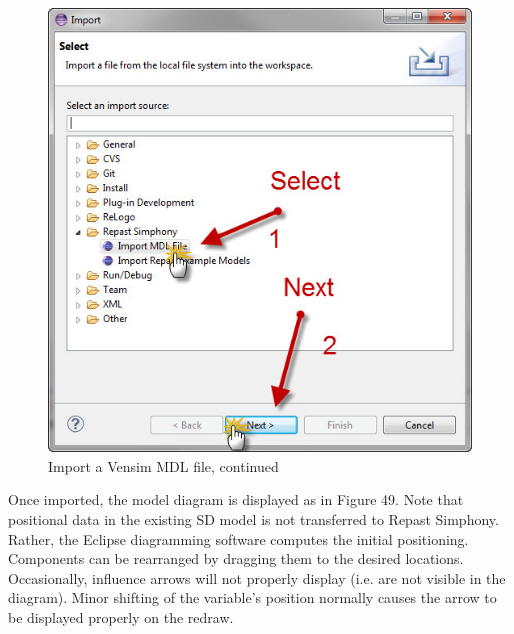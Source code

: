 \documentclass[11pt]{amsart}
\begin{document}
\begin{figure}[ht]
\begin{center}
\vspace{.2in}
\centerline {
\includegraphics[totalheight=0.3\textheight]{images/046.jpg}
}
\caption{Import a Vensim MDL file, continued}
\label{fig:046}
\end{center}
\end{figure}

Once imported, the model diagram is displayed as in Figure 49. Note that positional data in the existing SD model is not transferred to Repast Simphony. Rather, the Eclipse diagramming software computes the initial positioning. Components can be rearranged by dragging them to the desired locations. Occasionally, influence arrows will not properly display (i.e. are not visible in the diagram). Minor shifting of the variable’s position normally causes the arrow to be displayed properly on the redraw.
\end{document}
